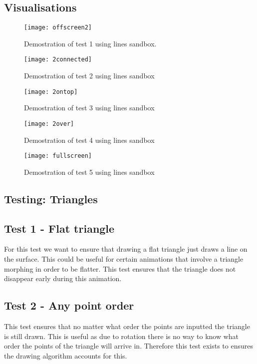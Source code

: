 \documentclass[
	a4paper, %
	10pt, %
]{CSUniSchoolLabReport}
\begin{document}
\subsection*{Visualisations}
\begin{figure}[H]
	\centering
	\begin{minipage}[b]{0.4\textwidth}
		\texttt{[image: offscreen2]}
		\caption{Demostration of test 1 using lines sandbox.}
	\end{minipage}
	\hfill
	\begin{minipage}[b]{0.4\textwidth}
		\texttt{[image: 2connected]}
		\caption{Demostration of test 2 using lines sandbox}
  	\end{minipage}
\end{figure}
\begin{figure}[H]
	\centering
	\begin{minipage}[b]{0.4\textwidth}
		\texttt{[image: 2ontop]}
		\caption{Demostration of test 3 using lines sandbox}
	\end{minipage}
	\hfill
	\begin{minipage}[b]{0.4\textwidth}
		\texttt{[image: 2over]}
		\caption{Demostration of test 4 using lines sandbox}
  	\end{minipage}
\end{figure}
\begin{figure}[H]
	\centering
	\texttt{[image: fullscreen]}
	\caption{Demostration of test 5 using lines sandbox}	
\end{figure}
\subsection{Testing: Triangles}
\subsection*{Test 1 {-} Flat triangle}
For this test we want to ensure that drawing a flat triangle just draws a line on the surface.
This could be useful for certain animations that involve a triangle morphing in order to be flatter. 
This test ensures that the triangle does not disappear early during this animation.
\subsection*{Test 2 {-} Any point order}
This test ensures that no matter what order the points are inputted the triangle is still drawn.
This is useful as due to rotation there is no way to know what order the points of the triangle will 
arrive in. Therefore this test exists to ensures the drawing algorithm accounts for this.
\end{document}

